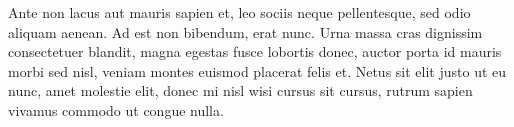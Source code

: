 \documentclass[12pt, a4paper]{TMR}
\begin{document}
\begin{coverletter}
 Ante non lacus aut mauris sapien et, leo sociis neque pellentesque, sed odio aliquam aenean. Ad est non bibendum, erat nunc. Urna massa cras dignissim consectetuer blandit, magna egestas fusce lobortis donec, auctor porta id mauris morbi sed nisl, veniam montes euismod placerat felis et. Netus sit elit justo ut eu nunc, amet molestie elit, donec mi nisl wisi cursus sit cursus, rutrum sapien vivamus commodo ut congue nulla.

\end{coverletter}
\end{document}
